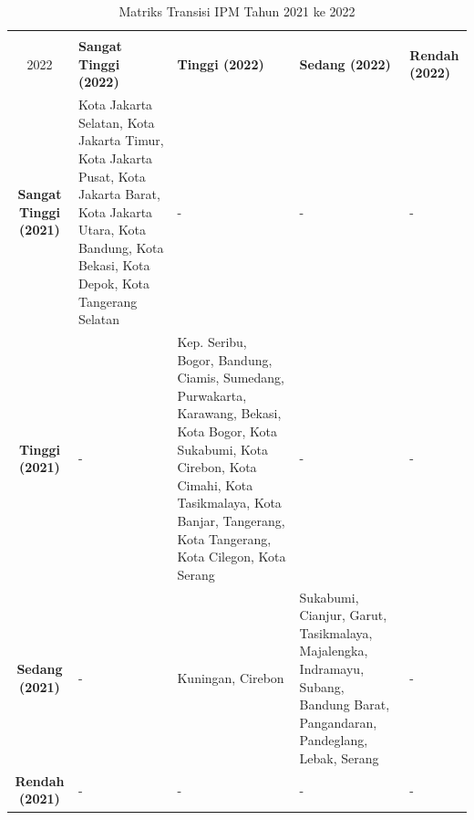 \begin{table}[H]
\centering
\caption{Matriks Transisi IPM Tahun 2021 ke 2022} \label{tab:ipm_transisi_2021_2022}
\begin{tabular}{|c|p{2cm}|p{2cm}|p{2cm}|p{2cm}|}
\hline
\textbf{Tahun 2021 \\ 2022} & \textbf{Sangat Tinggi (2022)} & \textbf{Tinggi (2022)} & \textbf{Sedang (2022)} & \textbf{Rendah (2022)} \\ \hline
\textbf{Sangat Tinggi (2021)} & Kota Jakarta Selatan, Kota Jakarta Timur, Kota Jakarta Pusat, Kota Jakarta Barat, Kota Jakarta Utara, Kota Bandung, Kota Bekasi, Kota Depok, Kota Tangerang Selatan & - & - & - \\ \hline
\textbf{Tinggi (2021)} & - & Kep. Seribu, Bogor, Bandung, Ciamis, Sumedang, Purwakarta, Karawang, Bekasi, Kota Bogor, Kota Sukabumi, Kota Cirebon, Kota Cimahi, Kota Tasikmalaya, Kota Banjar, Tangerang, Kota Tangerang, Kota Cilegon, Kota Serang & - & - \\ \hline
\textbf{Sedang (2021)} & - & Kuningan, Cirebon & Sukabumi, Cianjur, Garut, Tasikmalaya, Majalengka, Indramayu, Subang, Bandung Barat, Pangandaran, Pandeglang, Lebak, Serang & - \\ \hline
\textbf{Rendah (2021)} & - & - & - & - \\ \hline
\end{tabular}
\end{table}